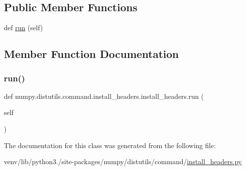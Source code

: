 \subsection*{Public Member Functions}
\begin{DoxyCompactItemize}
\item 
def \hyperlink{classnumpy_1_1distutils_1_1command_1_1install__headers_1_1install__headers_a070c3e4223852a8053faf73c8e658c26}{run} (self)
\end{DoxyCompactItemize}


\subsection{Member Function Documentation}
\mbox{\label{classnumpy_1_1distutils_1_1command_1_1install__headers_1_1install__headers_a070c3e4223852a8053faf73c8e658c26}} 
\subsubsection{\texorpdfstring{run()}{run()}}
{\footnotesize\ttfamily def numpy.\+distutils.\+command.\+install\+\_\+headers.\+install\+\_\+headers.\+run (\begin{DoxyParamCaption}\item[{}]{self }\end{DoxyParamCaption})}



The documentation for this class was generated from the following file\+:\begin{DoxyCompactItemize}
\item 
venv/lib/python3./site-\/packages/numpy/distutils/command/\hyperlink{numpy_2distutils_2command_2install__headers_8py}{install\+\_\+headers.\+py}\end{DoxyCompactItemize}
